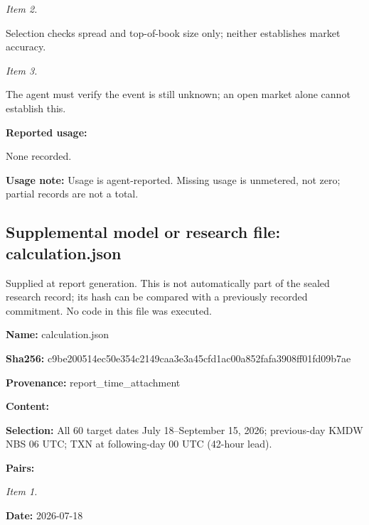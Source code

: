 \documentclass[11pt]{article}
\begin{document}
\par\noindent\textit{Item 2.}\par Selection checks spread and top-of-book size only; neither establishes market accuracy.

\par\noindent\textit{Item 3.}\par The agent must verify the event is still unknown; an open market alone cannot establish this.

\par\noindent\textbf{Reported usage:} \par None recorded.

\par\noindent\textbf{Usage note:} Usage is agent-reported. Missing usage is unmetered, not zero; partial records are not a total.

\subsection*{\textcolor{epdarkgreen}{Supplemental model or research file: calculation.json}}
Supplied at report generation. This is not automatically part of the sealed research record; its hash can be compared with a previously recorded commitment. No code in this file was executed.


\par\noindent\textbf{Name:} calculation.json

\par\noindent\textbf{Sha256:} c9be200514ec\hspace{0pt}50e354c2149c\hspace{0pt}aa3e3a45cfd1\hspace{0pt}ac00a852fafa\hspace{0pt}3908ff01fd09\hspace{0pt}b7ae

\par\noindent\textbf{Provenance:} report\_time\_attachment

\par\noindent\textbf{Content:} \par \par\noindent\textbf{Selection:} All 60 target dates July 18–September 15, 2026; previous-day KMDW NBS 06 UTC; TXN at following-day 00 UTC (42-hour lead).

\par\noindent\textbf{Pairs:} \par \par\noindent\textit{Item 1.}\par \par\noindent\textbf{Date:} 2026-07-18
\end{document}
